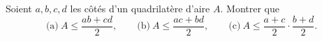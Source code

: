 Soient $a, b, c, d$ les côtés d'un quadrilatère d'aire $A$. Montrer que
\[ \text{(a)}\ A \leq \frac{ab + cd}{2},\qquad \text{(b)}\ A \leq \frac{ac + bd}{2},\qquad \text{(c)}\ A \leq \frac{a + c}{2} \cdot \frac{b + d}{2}. \]
